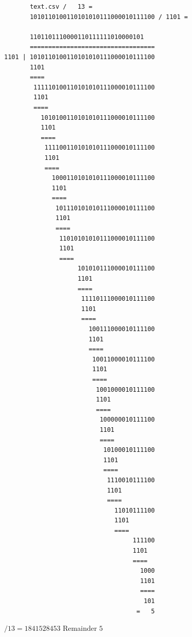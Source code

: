 \begin{verbatim}
       text.csv /   13 = 
       1010110100110101010111000010111100 / 1101 = 

       1101101110000110111111010000101
       ==================================
1101 | 1010110100110101010111000010111100
       1101
       ====
        111110100110101010111000010111100
        1101
        ====
          1010100110101010111000010111100
          1101
          ====
           111100110101010111000010111100
           1101
           ====
             1000110101010111000010111100
             1101
             ====
              101110101010111000010111100
              1101
              ====
               11010101010111000010111100
               1101
               ====
                    101010111000010111100
                    1101
                    ====
                     11110111000010111100
                     1101
                     ====
                       100111000010111100
                       1101
                       ====
                        10011000010111100
                        1101
                        ====
                         1001000010111100
                         1101
                         ====
                          100000010111100
                          1101
                          ====
                           10100010111100
                           1101
                           ====
                            1110010111100
                            1101
                            ====
                              11010111100
                              1101
                              ====
                                   111100
                                   1101
                                   ====
                                     1000
                                     1101
                                     ====
                                      101
                                    =   5

\end{verbatim}
$ / 13 = 1841528453$ Remainder $5$\\
